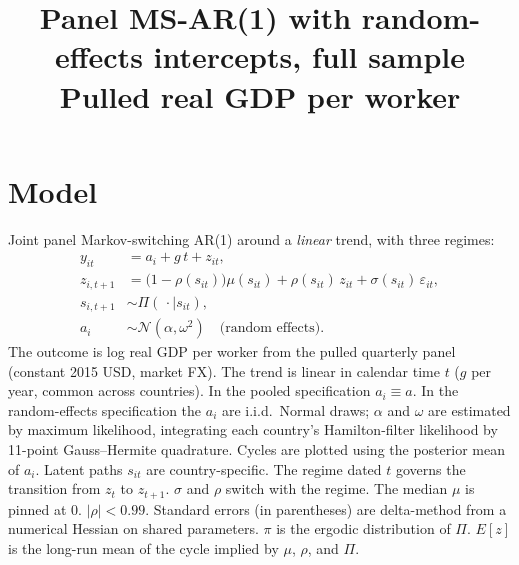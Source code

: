 \documentclass[11pt]{article}
\title{Panel MS-AR(1) with random-effects intercepts, full sample\\[0.4em]\large Pulled real GDP per worker}
\author{}
\date{}
\begin{document}
\maketitle
\section{Model}
Joint panel Markov-switching AR(1) around a \emph{linear} trend, with three regimes:
\begin{align}
y_{it} &= a_i + g\, t + z_{it}, \\
z_{i,t+1} &= \bigl(1-\rho(s_{it})\bigr)\mu(s_{it}) + \rho(s_{it})\, z_{it} + \sigma(s_{it})\,\varepsilon_{it}, \\
s_{i,t+1} &\sim \Pi(\,\cdot\mid s_{it}), \\
a_i &\sim \mathcal{N}(\alpha,\omega^2) \quad \text{(random effects)}.
\end{align}
The outcome is log real GDP per worker from the pulled quarterly panel (constant 2015 USD, market FX). The trend is linear in calendar time $t$ ($g$ per year, common across countries). In the pooled specification $a_i\equiv a$. In the random-effects specification the $a_i$ are i.i.d.\ Normal draws; $\alpha$ and $\omega$ are estimated by maximum likelihood, integrating each country's Hamilton-filter likelihood by 11-point Gauss--Hermite quadrature. Cycles are plotted using the posterior mean of $a_i$. Latent paths $s_{it}$ are country-specific. The regime dated $t$ governs the transition from $z_t$ to $z_{t+1}$. $\sigma$ and $\rho$ switch with the regime. The median $\mu$ is pinned at 0. $|\rho|<0.99$.
Standard errors (in parentheses) are delta-method from a numerical Hessian on shared parameters. $\pi$ is the ergodic distribution of $\Pi$. $E[z]$ is the long-run mean of the cycle implied by $\mu$, $\rho$, and $\Pi$.
\clearpage
\end{document}
